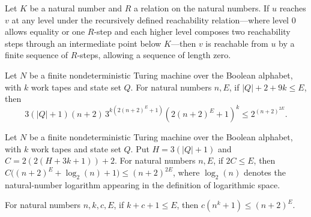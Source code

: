 \begin{theorem}
\label{Complexity.LogProg.SavitchARM.reflTransGen_of_reach}
\leanok
{}
Let $K$ be a natural number and $R$ a relation on the natural numbers. If $u$ reaches
$v$ at any level under the recursively defined reachability relation—where level $0$
allows equality or one $R$-step and each higher level composes two reachability steps
through an intermediate point below $K$—then $v$ is reachable from $u$ by a finite
sequence of $R$-steps, allowing a sequence of length zero.
\end{theorem}

\begin{theorem}
\label{Complexity.LogProg.SavitchARM.configBound_le}
\leanok
{}
Let $N$ be a finite nondeterministic Turing machine over the Boolean alphabet, with $k$
work tapes and state set $Q$. For natural numbers $n,E$, if $|Q|+2+9k\le E$, then
\[3(|Q|+1)(n+2)\,3^{k(2(n+2)^E+1)}(2(n+2)^E+1)^k\le 2^{(n+2)^{2E}}.\]
\end{theorem}

\begin{theorem}
\label{Complexity.LogProg.SavitchARM.codeWidth_le}
\leanok
{}
Let $N$ be a finite nondeterministic Turing machine over the Boolean alphabet, with $k$
work tapes and state set $Q$. Put $H=3(|Q|+1)$ and $C=2(2(H+3k+1))+2$. For natural
numbers $n,E$, if $2C\le E$, then $C\big((n+2)^E+\log_2(n)+1\big)\le(n+2)^{2E}$, where
$\log_2(n)$ denotes the natural-number logarithm appearing in the definition of
logarithmic space.
\end{theorem}

\begin{theorem}
\label{Complexity.LogProg.SavitchARM.radius_le}
\leanok
{}
For natural numbers $n,k,c,E$, if $k+c+1\le E$, then $c(n^k+1)\le(n+2)^E$.
\end{theorem}

